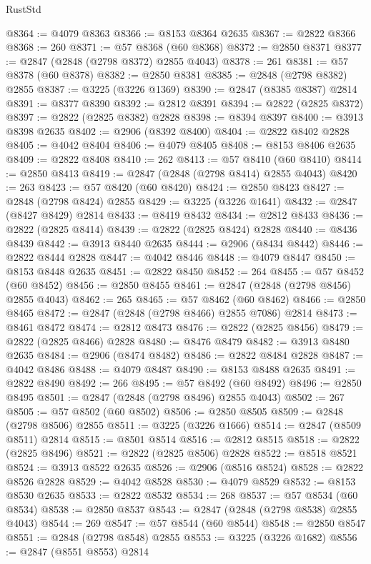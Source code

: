 \begin{lexlean}{RustStd}
\begin{coremodule}
@8364 := @4079 @8363
@8366 := @8153 @8364 @2635
@8367 := @2822 @8366
@8368 := 260
@8371 := @57 @8368 (@60 @8368)
@8372 := @2850 @8371
@8377 := @2847 (@2848 (@2798 @8372) @2855 @4043)
@8378 := 261
@8381 := @57 @8378 (@60 @8378)
@8382 := @2850 @8381
@8385 := @2848 (@2798 @8382) @2855
@8387 := @3225 (@3226 @1369)
@8390 := @2847 (@8385 @8387) @2814
@8391 := @8377 @8390
@8392 := @2812 @8391
@8394 := @2822 (@2825 @8372)
@8397 := @2822 (@2825 @8382) @2828
@8398 := @8394 @8397
@8400 := @3913 @8398 @2635
@8402 := @2906 (@8392 @8400)
@8404 := @2822 @8402 @2828
@8405 := @4042 @8404
@8406 := @4079 @8405
@8408 := @8153 @8406 @2635
@8409 := @2822 @8408
@8410 := 262
@8413 := @57 @8410 (@60 @8410)
@8414 := @2850 @8413
@8419 := @2847 (@2848 (@2798 @8414) @2855 @4043)
@8420 := 263
@8423 := @57 @8420 (@60 @8420)
@8424 := @2850 @8423
@8427 := @2848 (@2798 @8424) @2855
@8429 := @3225 (@3226 @1641)
@8432 := @2847 (@8427 @8429) @2814
@8433 := @8419 @8432
@8434 := @2812 @8433
@8436 := @2822 (@2825 @8414)
@8439 := @2822 (@2825 @8424) @2828
@8440 := @8436 @8439
@8442 := @3913 @8440 @2635
@8444 := @2906 (@8434 @8442)
@8446 := @2822 @8444 @2828
@8447 := @4042 @8446
@8448 := @4079 @8447
@8450 := @8153 @8448 @2635
@8451 := @2822 @8450
@8452 := 264
@8455 := @57 @8452 (@60 @8452)
@8456 := @2850 @8455
@8461 := @2847 (@2848 (@2798 @8456) @2855 @4043)
@8462 := 265
@8465 := @57 @8462 (@60 @8462)
@8466 := @2850 @8465
@8472 := @2847 (@2848 (@2798 @8466) @2855 @7086) @2814
@8473 := @8461 @8472
@8474 := @2812 @8473
@8476 := @2822 (@2825 @8456)
@8479 := @2822 (@2825 @8466) @2828
@8480 := @8476 @8479
@8482 := @3913 @8480 @2635
@8484 := @2906 (@8474 @8482)
@8486 := @2822 @8484 @2828
@8487 := @4042 @8486
@8488 := @4079 @8487
@8490 := @8153 @8488 @2635
@8491 := @2822 @8490
@8492 := 266
@8495 := @57 @8492 (@60 @8492)
@8496 := @2850 @8495
@8501 := @2847 (@2848 (@2798 @8496) @2855 @4043)
@8502 := 267
@8505 := @57 @8502 (@60 @8502)
@8506 := @2850 @8505
@8509 := @2848 (@2798 @8506) @2855
@8511 := @3225 (@3226 @1666)
@8514 := @2847 (@8509 @8511) @2814
@8515 := @8501 @8514
@8516 := @2812 @8515
@8518 := @2822 (@2825 @8496)
@8521 := @2822 (@2825 @8506) @2828
@8522 := @8518 @8521
@8524 := @3913 @8522 @2635
@8526 := @2906 (@8516 @8524)
@8528 := @2822 @8526 @2828
@8529 := @4042 @8528
@8530 := @4079 @8529
@8532 := @8153 @8530 @2635
@8533 := @2822 @8532
@8534 := 268
@8537 := @57 @8534 (@60 @8534)
@8538 := @2850 @8537
@8543 := @2847 (@2848 (@2798 @8538) @2855 @4043)
@8544 := 269
@8547 := @57 @8544 (@60 @8544)
@8548 := @2850 @8547
@8551 := @2848 (@2798 @8548) @2855
@8553 := @3225 (@3226 @1682)
@8556 := @2847 (@8551 @8553) @2814

\end{coremodule}
\end{lexlean}
